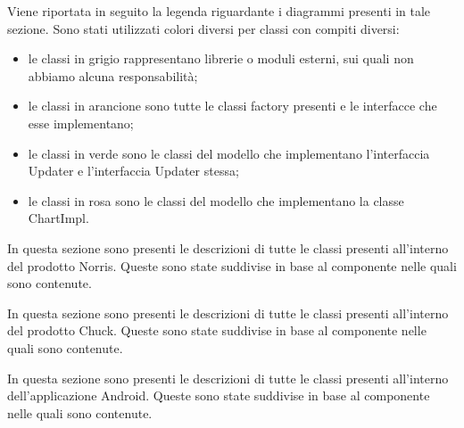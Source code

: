 		Viene riportata in seguito la legenda riguardante i diagrammi presenti in tale sezione. Sono stati utilizzati colori diversi per classi con compiti diversi:
		\begin{itemize}
			\item le classi in grigio rappresentano librerie o moduli esterni, sui quali non abbiamo alcuna responsabilità;
			\item le classi in arancione sono tutte le classi factory presenti e le interfacce che esse implementano;
			\item le classi in verde sono le classi del modello che implementano l'interfaccia Updater e l'interfaccia Updater stessa;
			\item le classi in rosa sono le classi del modello che implementano la classe ChartImpl.
		\end{itemize}
		In questa sezione sono presenti le descrizioni di tutte le classi presenti all'interno del prodotto Norris. Queste sono state suddivise in base al componente nelle quali sono contenute.
		
		
		In questa sezione sono presenti le descrizioni di tutte le classi presenti all'interno del prodotto Chuck. Queste sono state suddivise in base al componente nelle quali sono contenute.
		
		
		In questa sezione sono presenti le descrizioni di tutte le classi presenti all'interno dell'applicazione Android. Queste sono state suddivise in base al componente nelle quali sono contenute.
		
		
